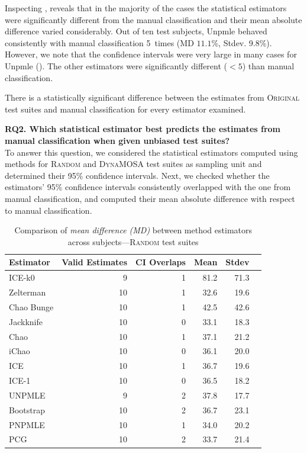 \documentclass[sigconf,review,anonymous]{acmart}
\newcommand{\ICEallrare}{ICE-k0\xspace}
\newcommand{\Zelterman}{Zelterman\xspace}
\newcommand{\ChaoBunge}{Chao Bunge\xspace}
\newcommand{\Jackknife}{Jackknife\xspace}
\newcommand{\Chao}{Chao\xspace}
\newcommand{\improvedChao}{iChao\xspace}
\newcommand{\ICE}{ICE\xspace}
\newcommand{\improvedICE}{ICE-1\xspace}
\newcommand{\Unpmle}{UNPMLE\xspace}
\newcommand{\Bootstrap}{Bootstrap\xspace}
\newcommand{\Pnpmle}{PNPMLE\xspace}
\newcommand{\PCG}{PCG\xspace}
\newcommand{\original}{\textsc{Original}\xspace}
\newcommand{\EvosuiteRandom}{\textsc{Random}\xspace}
\newcommand{\EvosuiteDynamosa}{\textsc{DynaMOSA}\xspace}
\begin{document}
Inspecting , reveals that in the majority of the cases the
statistical estimators were significantly different from the manual classification
and their mean absolute difference varied considerably.
Out of ten test subjects, Unpmle behaved consistently with manual classification
5~times (MD $11.1$\%, Stdev. 9.8\%). However, we note that the confidence
intervals were very large in many cases for Unpmle ().
%
The other estimators were significantly different ($<5$) than manual classification.

\begin{tcolorbox}[boxrule=0.5pt, arc=4pt, boxsep=0pt, width=\columnwidth]
There is a statistically significant difference between the estimates
from \original test suites and manual classification for
every estimator examined.
\end{tcolorbox}

\noindent\textbf{RQ2. Which statistical estimator best predicts the estimates
from manual classification when given unbiased test suites?}\\
%
To answer this question, we considered the statistical estimators computed
using methods for \EvosuiteRandom and \EvosuiteDynamosa test suites as sampling unit
and determined their 95\% confidence intervals.
%
Next, we checked whether the estimators' 95\% confidence intervals consistently
overlapped with the one from manual classification, and computed their mean absolute
difference with respect to manual classification.
\begin{table}
\caption{Comparison of \emph{mean difference (MD)} between method
estimators across subjects---\EvosuiteRandom test suites}
\begin{tabular}{|l|r|r|r|r|r|}
\hline
Estimator	&Valid Estimates	&CI Overlaps	&Mean	&Stdev	\\
\hline
\ICEallrare	&	9	&	1	&81.2	&	71.3\\
\Zelterman	&	10	&	1	&32.6	&	19.6\\
\ChaoBunge	&	10	&	1	&42.5	&	42.6\\
\Jackknife	&	10	&	0	&33.1	&	18.3\\
\Chao	&	10	&	1	&37.1	&	21.2\\
\improvedChao	&	10	&	0	&36.1	&	20.0\\
\ICE	&	10	&	1	&36.7	&	19.6\\
\improvedICE	&	10	&	0	&36.5	&	18.2\\
\Unpmle	&	9	&	2	&37.8	&	17.7\\
\Bootstrap	&	10	&	2	&36.7	&	23.1\\
\Pnpmle	&	10	&	1	&34.0	&	20.2\\
\PCG	&	10	&	2	&33.7	&	21.4\\
\hline
\end{tabular}
\label{tbl:estrandom}
\end{table}
\end{document}
